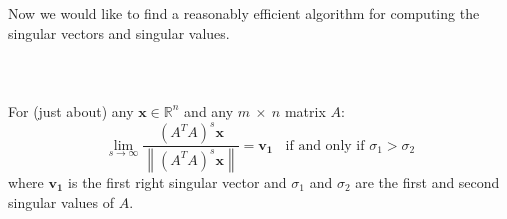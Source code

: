 \documentclass{tufte-handout}
\newcommand{\norm}[1]{\left\lVert#1\right\rVert}
\begin{document}
\noindent Now we would like to find a reasonably efficient algorithm for computing the singular vectors and singular values.\\\leavevmode\\

\\\leavevmode\\
\noindent For (just about) any $\mathbf{x}\in\mathbb{R}^n$ and any $m~\times~n$ matrix $A$:
\[
\lim_{s\rightarrow\infty}\frac{(A^TA)^s\mathbf{x}}{\norm{(A^TA)^s\mathbf{x}}}
=\mathbf{v_1}~~~~\text{if and only if }\sigma_{1}>\sigma_{2}
\]
where $\mathbf{v_1}$ is the first right singular vector and $\sigma_{1}$ and $\sigma_{2}$ are the first and second singular values of $A$.\\\leavevmode\\
\\\leavevmode\\
\end{document}

